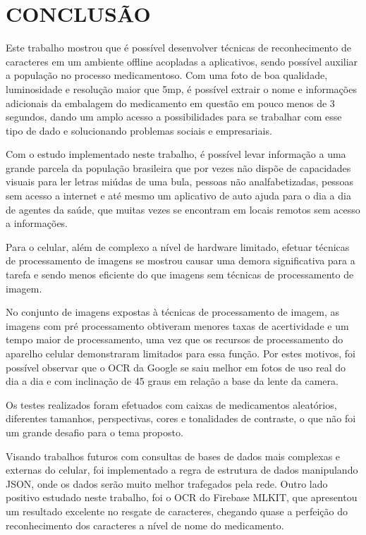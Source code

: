 \section{CONCLUSÃO}

Este trabalho mostrou que é possível desenvolver técnicas de reconhecimento de caracteres em um ambiente offline acopladas a aplicativos, sendo possível auxiliar a população no processo medicamentoso. Com uma foto de boa qualidade, luminosidade e resolução maior que 5mp, é possível extrair o nome e informações adicionais da embalagem do medicamento em questão em pouco menos de 3 segundos, dando um amplo acesso a possibilidades para se trabalhar com esse tipo de dado e solucionando problemas sociais e empresariais.

Com o estudo implementado neste trabalho, é possível levar informação a uma grande parcela da população brasileira que por vezes não dispõe de capacidades visuais para ler letras miúdas de uma bula, pessoas não analfabetizadas, pessoas sem acesso a internet e até mesmo um aplicativo de auto ajuda para o dia a dia de agentes da saúde, que muitas vezes se encontram em locais remotos sem acesso a informações.  

Para o celular, além de complexo a nível de hardware limitado, efetuar técnicas de processamento de imagens se mostrou causar uma demora significativa para a tarefa e sendo menos eficiente do que imagens sem técnicas de processamento de imagem.

No conjunto de imagens expostas à técnicas de processamento de imagem, as imagens com pré processamento obtiveram menores taxas de acertividade e um tempo maior de processamento, uma vez que os recursos de processamento do aparelho celular demonstraram limitados para essa função. Por estes motivos, foi possível observar que o OCR da Google se saiu melhor em fotos de uso real do dia a dia e com inclinação de 45 graus em relação a base da lente da camera.

Os testes realizados foram efetuados com caixas de medicamentos aleatórios, diferentes tamanhos, perspectivas, cores e tonalidades de contraste, o que não foi um grande desafio para o tema proposto. 

Visando trabalhos futuros com consultas de bases de dados mais complexas e externas do celular, foi implementado a regra de estrutura de dados manipulando JSON, onde os dados serão muito melhor trafegados pela rede. Outro lado positivo estudado neste trabalho, foi o OCR do Firebase MLKIT, que apresentou um resultado excelente no resgate de caracteres, chegando quase a perfeição do reconhecimento dos caracteres a nível de nome do medicamento.

